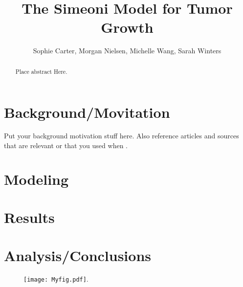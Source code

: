 \documentclass[11pt]{amsart}
\begin{document}
\title{The Simeoni Model for Tumor Growth}
\author{Sophie Carter, Morgan Nielsen, Michelle Wang, Sarah Winters}

\date{}

\maketitle

\begin{abstract}
Place abstract Here.
\end{abstract}

\section{Background/Movitation}

Put your background motivation stuff here. Also reference articles and sources that are relevant or that you used when  \cite{Vandermeersch}.

\section{Modeling}



\section{Results}

\section{Analysis/Conclusions}


\begin{figure}[h]
\begin{center} %
\texttt{[image: Myfig.pdf]}. %
\end{center}
\label{fig:MatrixError}
\end{figure}





\FloatBarrier %
\newpage


\end{document}
